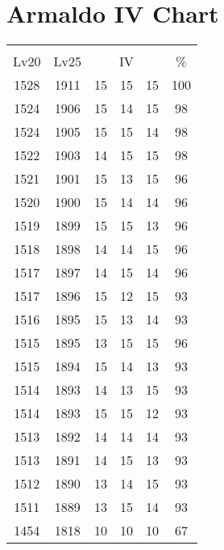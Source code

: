 \documentclass{article}%
\begin{document}
%
\normalsize%
\section{Armaldo IV Chart}%
\label{sec:Armaldo IV Chart}%
\renewcommand{\arraystretch}{1.5}%
\begin{tabular}{|c|c|c|c|c|c|}%
\hline%
\multicolumn{6}{|c|}{\textcolor{white}{ 
\linebreak{Armaldo}
}%
\cellcolor{black}}\\%
\multicolumn{1}{|c}{Lv20}&\multicolumn{1}{c|}{Lv25}&\multicolumn{3}{c|}{IV}&\multicolumn{1}{|c|}{\%}\\%
\hline%
\rowcolor{color100}%
1528&1911&15&15&15&100\\%
\hline%
\rowcolor{color98}%
1524&1906&15&14&15&98\\%
\hline%
\rowcolor{color98}%
1524&1905&15&15&14&98\\%
\hline%
\rowcolor{color98}%
1522&1903&14&15&15&98\\%
\hline%
\rowcolor{color96}%
1521&1901&15&13&15&96\\%
\hline%
\rowcolor{color96}%
1520&1900&15&14&14&96\\%
\hline%
\rowcolor{color96}%
1519&1899&15&15&13&96\\%
\hline%
\rowcolor{color96}%
1518&1898&14&14&15&96\\%
\hline%
\rowcolor{color96}%
1517&1897&14&15&14&96\\%
\hline%
\rowcolor{color93}%
1517&1896&15&12&15&93\\%
\hline%
\rowcolor{color93}%
1516&1895&15&13&14&93\\%
\hline%
\rowcolor{color96}%
1515&1895&13&15&15&96\\%
\hline%
\rowcolor{color93}%
1515&1894&15&14&13&93\\%
\hline%
\rowcolor{color93}%
1514&1893&14&13&15&93\\%
\hline%
\rowcolor{color93}%
1514&1893&15&15&12&93\\%
\hline%
\rowcolor{color93}%
1513&1892&14&14&14&93\\%
\hline%
\rowcolor{color93}%
1513&1891&14&15&13&93\\%
\hline%
\rowcolor{color93}%
1512&1890&13&14&15&93\\%
\hline%
\rowcolor{color93}%
1511&1889&13&15&14&93\\%
\hline%
\rowcolor{color91}%
1454&1818&10&10&10&67\\%
\end{tabular}

%
\end{document}

